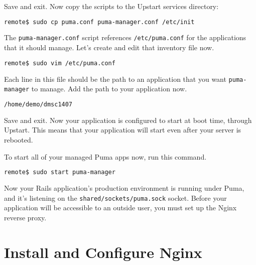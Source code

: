 Save and exit.
Now copy the scripts to the Upstart services directory:

\begin{minipage}{\linewidth}
\begin{lstlisting}[language=bash]
remote$ sudo cp puma.conf puma-manager.conf /etc/init
\end{lstlisting}
\end{minipage}

The \texttt{puma-manager.conf} script references \texttt{/etc/puma.conf}
for the applications that it should manage.
Let's create and edit that inventory file now.

\begin{minipage}{\linewidth}
\begin{lstlisting}[language=bash]
remote$ sudo vim /etc/puma.conf
\end{lstlisting}
\end{minipage}

Each line in this file should be the path to an application that you
want \texttt{puma-manager} to manage.
Add the path to your application now.

\begin{minipage}{\linewidth}
  \begin{lstlisting}[language=bash, caption={/etc/puma.conf}]
/home/demo/dmsc1407
\end{lstlisting}
\end{minipage}

Save and exit. Now your application is configured to start at boot time,
through Upstart. This means that your application will start even after
your server is rebooted.

To start all of your managed Puma apps now, run this command.

\begin{minipage}{\linewidth}
\begin{lstlisting}[language=bash]
remote$ sudo start puma-manager
\end{lstlisting}
\end{minipage}

Now your Rails application's production environment is running under Puma,
and it's listening on the \texttt{shared/sockets/puma.sock} socket.
Before your application will be accessible to an outside user,
you must set up the Nginx reverse proxy.

\section{Install and Configure Nginx}

